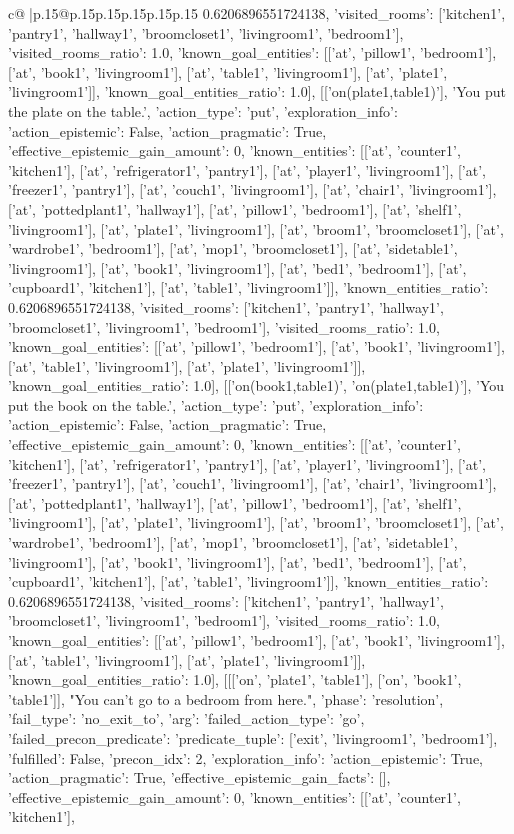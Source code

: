 \documentclass{article}
\begin{document}
{\begin{supertabular}{c@{$\;$}|p{.15\linewidth}@{}p{.15\linewidth}p{.15\linewidth}p{.15\linewidth}p{.15\linewidth}p{.15\linewidth}}
{{{0.6206896551724138, 'visited_rooms': ['kitchen1', 'pantry1', 'hallway1', 'broomcloset1', 'livingroom1', 'bedroom1'], 'visited_rooms_ratio': 1.0, 'known_goal_entities': [['at', 'pillow1', 'bedroom1'], ['at', 'book1', 'livingroom1'], ['at', 'table1', 'livingroom1'], ['at', 'plate1', 'livingroom1']], 'known_goal_entities_ratio': 1.0}}], [['on(plate1,table1)'], 'You put the plate on the table.', {'action_type': 'put', 'exploration_info': {'action_epistemic': False, 'action_pragmatic': True, 'effective_epistemic_gain_amount': 0, 'known_entities': [['at', 'counter1', 'kitchen1'], ['at', 'refrigerator1', 'pantry1'], ['at', 'player1', 'livingroom1'], ['at', 'freezer1', 'pantry1'], ['at', 'couch1', 'livingroom1'], ['at', 'chair1', 'livingroom1'], ['at', 'pottedplant1', 'hallway1'], ['at', 'pillow1', 'bedroom1'], ['at', 'shelf1', 'livingroom1'], ['at', 'plate1', 'livingroom1'], ['at', 'broom1', 'broomcloset1'], ['at', 'wardrobe1', 'bedroom1'], ['at', 'mop1', 'broomcloset1'], ['at', 'sidetable1', 'livingroom1'], ['at', 'book1', 'livingroom1'], ['at', 'bed1', 'bedroom1'], ['at', 'cupboard1', 'kitchen1'], ['at', 'table1', 'livingroom1']], 'known_entities_ratio': 0.6206896551724138, 'visited_rooms': ['kitchen1', 'pantry1', 'hallway1', 'broomcloset1', 'livingroom1', 'bedroom1'], 'visited_rooms_ratio': 1.0, 'known_goal_entities': [['at', 'pillow1', 'bedroom1'], ['at', 'book1', 'livingroom1'], ['at', 'table1', 'livingroom1'], ['at', 'plate1', 'livingroom1']], 'known_goal_entities_ratio': 1.0}}], [['on(book1,table1)', 'on(plate1,table1)'], 'You put the book on the table.', {'action_type': 'put', 'exploration_info': {'action_epistemic': False, 'action_pragmatic': True, 'effective_epistemic_gain_amount': 0, 'known_entities': [['at', 'counter1', 'kitchen1'], ['at', 'refrigerator1', 'pantry1'], ['at', 'player1', 'livingroom1'], ['at', 'freezer1', 'pantry1'], ['at', 'couch1', 'livingroom1'], ['at', 'chair1', 'livingroom1'], ['at', 'pottedplant1', 'hallway1'], ['at', 'pillow1', 'bedroom1'], ['at', 'shelf1', 'livingroom1'], ['at', 'plate1', 'livingroom1'], ['at', 'broom1', 'broomcloset1'], ['at', 'wardrobe1', 'bedroom1'], ['at', 'mop1', 'broomcloset1'], ['at', 'sidetable1', 'livingroom1'], ['at', 'book1', 'livingroom1'], ['at', 'bed1', 'bedroom1'], ['at', 'cupboard1', 'kitchen1'], ['at', 'table1', 'livingroom1']], 'known_entities_ratio': 0.6206896551724138, 'visited_rooms': ['kitchen1', 'pantry1', 'hallway1', 'broomcloset1', 'livingroom1', 'bedroom1'], 'visited_rooms_ratio': 1.0, 'known_goal_entities': [['at', 'pillow1', 'bedroom1'], ['at', 'book1', 'livingroom1'], ['at', 'table1', 'livingroom1'], ['at', 'plate1', 'livingroom1']], 'known_goal_entities_ratio': 1.0}}], [[['on', 'plate1', 'table1'], ['on', 'book1', 'table1']], "You can't go to a bedroom from here.", {'phase': 'resolution', 'fail_type': 'no_exit_to', 'arg': {'failed_action_type': 'go', 'failed_precon_predicate': {'predicate_tuple': ['exit', 'livingroom1', 'bedroom1'], 'fulfilled': False, 'precon_idx': 2}}, 'exploration_info': {'action_epistemic': True, 'action_pragmatic': True, 'effective_epistemic_gain_facts': [], 'effective_epistemic_gain_amount': 0, 'known_entities': [['at', 'counter1', 'kitchen1'], }}}
\end{supertabular}}
\end{document}
